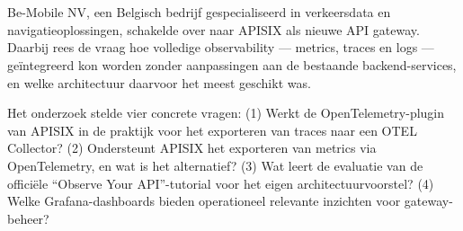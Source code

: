 
%
%
%
%
%

%



\chapter*{}

Be-Mobile NV, een Belgisch bedrijf gespecialiseerd in verkeersdata en navigatieoplossingen, schakelde over naar APISIX als nieuwe API gateway. Daarbij rees de vraag hoe volledige observability --- metrics, traces en logs --- geïntegreerd kon worden zonder aanpassingen aan de bestaande backend-services, en welke architectuur daarvoor het meest geschikt was.

Het onderzoek stelde vier concrete vragen: (1) Werkt de OpenTelemetry-plugin van APISIX in de praktijk voor het exporteren van traces naar een OTEL Collector? (2) Ondersteunt APISIX het exporteren van metrics via OpenTelemetry, en wat is het alternatief? (3) Wat leert de evaluatie van de officiële ``Observe Your API''-tutorial voor het eigen architectuurvoorstel? (4) Welke Grafana-dashboards bieden operationeel relevante inzichten voor gateway-beheer?

